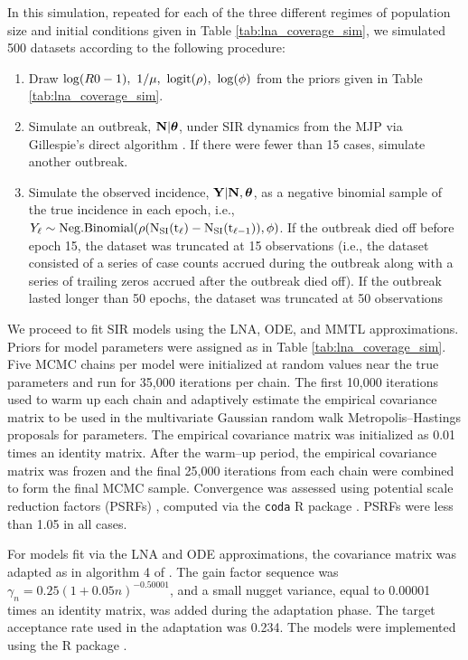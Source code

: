 In this simulation, repeated for each of the three different regimes of population size and initial conditions given in Table \ref{tab:lna_coverage_sim}, we simulated 500 datasets according to the following procedure:
\begin{enumerate}
	\item Draw $ \log(R0 - 1),\ 1/\mu,\ \logit(\rho),\ \log(\phi) $ from the priors given in Table \ref{tab:lna_coverage_sim}.
	\item Simulate an outbreak, $ \mathbf{N}|\boldsymbol{\theta} $, under SIR dynamics from the MJP via Gillespie's direct algorithm \cite{gillespie1976general}. If there were fewer than 15 cases, simulate another outbreak. 
	\item Simulate the observed incidence, $ \mathbf{Y}|\mathbf{N},\boldsymbol{\theta} $, as a negative binomial sample of the true incidence in each epoch, i.e., $ Y_\ell\sim\mathrm{Neg.Binomial(\rho(N_{SI}(t_\ell) - N_{SI}(t_{\ell-1})), \phi)} $. If the outbreak died off before epoch 15, the dataset was truncated at 15 observations (i.e., the dataset consisted of a series of case counts accrued during the outbreak along with a series of trailing zeros accrued after the outbreak died off). If the outbreak lasted longer than 50 epochs, the dataset was truncated at 50 observations
\end{enumerate}

We proceed to fit SIR models using the LNA, ODE, and MMTL approximations. Priors for model parameters were assigned as in Table \ref{tab:lna_coverage_sim}. Five MCMC chains per model were initialized at random values near the true parameters and run for 35,000 iterations per chain. The first 10,000 iterations used to warm up each chain and adaptively estimate the empirical covariance matrix to be used in the multivariate Gaussian random walk Metropolis--Hastings proposals for parameters. The empirical covariance matrix was initialized as 0.01 times an identity matrix. After the warm--up period, the empirical covariance matrix was frozen and the final 25,000 iterations from each chain were combined to form the final MCMC sample. Convergence was assessed using potential scale reduction factors (PSRFs) \cite{brooks1998general}, computed via the \texttt{coda} R package \cite{codapackage}. PSRFs were less than 1.05 in all cases.

For models fit via the LNA and ODE approximations, the covariance matrix was adapted as in algorithm 4 of \cite{andrieu2008tutorial}. The gain factor sequence was $\gamma_n = 0.25(1 + 0.05n)^{-0.50001}$, and a small nugget variance, equal to 0.00001 times an identity matrix, was added during the adaptation phase. The target acceptance rate used in the adaptation was 0.234. The models were implemented using the  R package \cite{stemr}.

